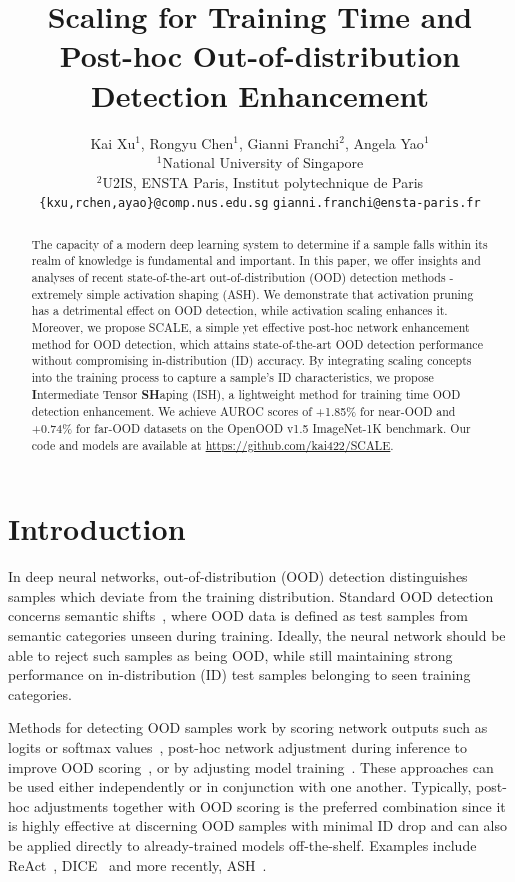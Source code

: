 \documentclass{article} %
\title{Scaling for Training Time and Post-hoc Out-of-distribution Detection Enhancement}
\author{Kai Xu$^{1}$, Rongyu Chen$^1$, Gianni Franchi$^2$, Angela Yao$^{1}$ \\
$^1$National University of Singapore\\
$^2$U2IS, ENSTA Paris, Institut polytechnique de Paris\\
{\scriptsize \texttt{\{kxu,rchen,ayao\}@comp.nus.edu.sg} \quad \texttt{gianni.franchi@ensta-paris.fr}} \\
}
\theoremstyle{plain}
\begin{document}
\maketitle

\begin{abstract}
The capacity of a modern deep learning system to determine if a sample falls within its realm of knowledge is fundamental and important.
In this paper, we offer insights and analyses of recent state-of-the-art out-of-distribution (OOD) detection methods - extremely simple activation shaping (ASH). We demonstrate that activation pruning has a detrimental effect on OOD detection, while activation scaling enhances it.
Moreover, we propose SCALE, a simple yet effective post-hoc network enhancement method for OOD detection, which attains state-of-the-art OOD detection performance without compromising in-distribution (ID) accuracy. By integrating scaling concepts into the training process to capture a sample's ID characteristics, we propose \textbf{I}ntermediate Tensor \textbf{SH}aping (ISH), a lightweight method for training time OOD detection enhancement. We achieve AUROC scores of +1.85\% for near-OOD and +0.74\% for far-OOD datasets on the OpenOOD v1.5 ImageNet-1K benchmark. Our code and models are available at \url{https://github.com/kai422/SCALE}.

\end{abstract}


\section{Introduction}
In deep neural networks, out-of-distribution (OOD) detection distinguishes samples which deviate from the training distribution. Standard OOD detection concerns semantic shifts~\citep{DBLP:conf/nips/YangWZZDPWCLSDZ22/OpenOOD, DBLP:journals/corr/abs-2306-09301/OpenOODv1.5}, where OOD data is defined as test samples from semantic categories unseen during training.  Ideally, the neural network should be able to reject such samples as being OOD, while still maintaining strong performance on in-distribution (ID) test samples belonging to seen training categories.


Methods for detecting OOD samples work by scoring network outputs such as logits or softmax values~\citep{DBLP:conf/iclr/HendrycksG17/MSP,DBLP:conf/icml/HendrycksBMZKMS22/MLS}, post-hoc network adjustment during inference to improve OOD scoring~\citep{DBLP:conf/eccv/SunL22a/DICE, DBLP:conf/nips/SunGL21/ReAct,DBLP:conf/iclr/DjurisicBAL23/ASH}, or by adjusting model training~\citep{DBLP:conf/icml/WeiXCF0L22/LogitNorm,DBLP:conf/iclr/MingSD023/CIDER,DBLP:journals/corr/abs-1802-04865/ConfBranch}. These approaches can be used either independently or in conjunction with one another.  Typically, post-hoc adjustments together with OOD scoring is the preferred combination since it is highly effective at discerning OOD samples with minimal ID drop and can also be applied directly to already-trained models off-the-shelf.  Examples include ReAct~\citep{DBLP:conf/nips/SunGL21/ReAct}, DICE~\citep{DBLP:conf/eccv/SunL22a/DICE} and more recently, ASH~\citep{DBLP:conf/iclr/DjurisicBAL23/ASH}.
\end{document}
